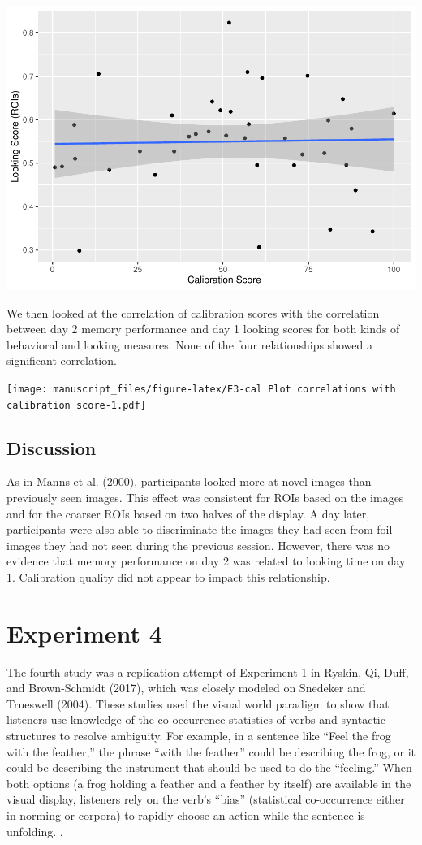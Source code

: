 \documentclass[
  man,floatsintext]{apa6}
\begin{document}
\includegraphics{manuscript_files/figure-latex/E3-cal Plot looking score (roi) by calibration-1.pdf}

We then looked at the correlation of calibration scores with the correlation between day 2 memory performance and day 1 looking scores for both kinds of behavioral and looking measures. None of the four relationships showed a significant correlation.

\texttt{[image: manuscript\_files/figure-latex/E3-cal Plot correlations with calibration score-1.pdf]}

\subsection{Discussion}\label{discussion-2}

As in Manns et al. (2000), participants looked more at novel images than previously seen images. This effect was consistent for ROIs based on the images and for the coarser ROIs based on two halves of the display. A day later, participants were also able to discriminate the images they had seen from foil images they had not seen during the previous session. However, there was no evidence that memory performance on day 2 was related to looking time on day 1. Calibration quality did not appear to impact this relationship.

\section{Experiment 4}\label{experiment-4}

The fourth study was a replication attempt of Experiment 1 in
Ryskin, Qi, Duff, and Brown-Schmidt (2017), which was closely modeled on
Snedeker and Trueswell (2004). These studies used the
visual world paradigm to show that listeners use knowledge of the
co-occurrence statistics of verbs and syntactic structures to resolve
ambiguity. For example, in a sentence like ``Feel the frog with the
feather,'' the phrase ``with the feather'' could be describing the frog, or
it could be describing the instrument that should be used to do the
``feeling.'' When both options (a frog holding a feather and a feather by
itself) are available in the visual display, listeners rely on the
verb's ``bias'' (statistical co-occurrence either in norming or corpora)
to rapidly choose an action while the sentence is unfolding. .
\end{document}
